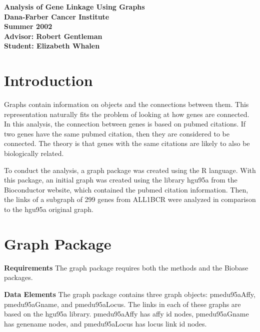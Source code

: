 \documentclass{article}[12pt]
\begin{document}
\begin{titlepage}
\begin{center}
\Large
\vspace*{1in}
\textbf{Analysis of Gene Linkage Using Graphs} \\
\vspace{1in}
\textbf{Dana-Farber Cancer Institute}\\ 
\textbf{Summer 2002} \\
\vspace{1in} 
\textbf{Advisor:  Robert Gentleman} \\
\textbf{Student:  Elizabeth Whalen} \\
\end{center}
\end{titlepage}
\normalsize
\newpage


\renewcommand{\baselinestretch}{1.5}
\section*{Introduction}
\small  
Graphs contain information on objects and the connections between them.  
This representation naturally fits the problem of looking at how genes
are connected.  In this analysis, the connection between genes is based on 
pubmed citations.  If two genes have the same pubmed citation, then
they are considered to be connected.  The theory is that genes with the same
citations are likely to also be biologically related.


To conduct the analysis, a graph package was created using the R language.
With this package, an initial graph was created using the library hgu95a 
from the Bioconductor website, which contained the pubmed citation 
information.  Then, the links of a subgraph of 299 genes from ALL1BCR 
were analyzed in comparison to the hgu95a original graph.

\noindent
\normalsize

\section*{Graph Package}

\noindent
{\bf Requirements}
\noindent
The graph package requires both the methods and the Biobase packages.


\noindent
{\bf Data Elements}
\noindent
The graph package contains three graph objects: pmedu95aAffy, 
pmedu95aGname, and pmedu95aLocus.  The links in each of these graphs 
are based on the hgu95a library.  pmedu95aAffy has affy id nodes, 
pmedu95aGname has genename nodes, and pmedu95aLocus has locus link id nodes.
\end{document}
